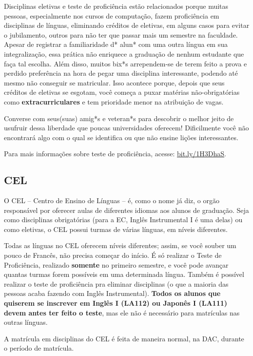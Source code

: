 Disciplinas eletivas e teste de proficiência estão relacionados porque muitas
pessoas, especialmente nos cursos de computação, fazem proficiência em
disciplinas de línguas, eliminando créditos de eletivas, em alguns casos para
evitar o jubilamento, outros para não ter que passar mais um semestre na
faculdade. Apesar de registrar a familiaridade d* alun* com uma outra língua em
sua integralização, essa prática não enriquece a graduação de nenhum estudante
que faça tal escolha. Além disso, muitos bix*s arrependem-se de terem feito a
prova e perdido preferência na hora de pegar uma disciplina interessante,
podendo até mesmo não conseguir se matricular. Isso acontece porque, depois que
seus créditos de eletivas se esgotam, você começa a puxar matérias
não-obrigatórias como \textbf{extracurriculares} e tem prioridade menor na
atribuição de vagas.

Converse com seus(suas) amig*s e veteran*s para descobrir o melhor jeito de
usufruir dessa liberdade que poucas universidades oferecem! Dificilmente você
não encontrará algo com o qual se identifica ou que não ensine lições
interessantes.

Para mais informações sobre teste de proficiência, acesse: \url{bit.ly/1H3DhaS}.

\subsection{CEL}

O CEL – Centro de Ensino de Línguas – é, como o nome já diz, o orgão responsável
por oferecer aulas de diferentes idiomas aos alunos de graduação. Seja como
disciplinas obrigatórias (para a EC, Inglês Instrumental I é uma delas) ou como
eletivas, o CEL possui turmas de várias línguas, em níveis diferentes.

Todas as línguas no CEL oferecem níveis diferentes; assim, se você souber um pouco
de Francês, não precisa começar do início. É só realizar o Teste de Proficiência,
realizado \textbf{somente} no primeiro semestre, e você pode avançar quantas turmas
forem possíveis em uma determinada língua. Também é possível realizar o teste de
proficiência pra eliminar disciplinas (o que a maioria das pessoas acaba fazendo
com Inglês Instrumental). \textbf{Todos os alunos que quiserem se inscrever em Inglês I
(LA112) ou Japonês I (LA111) devem antes ter feito o teste}, mas ele não é necessário
para matrículas nas outras línguas.

A matrícula em disciplinas do CEL é feita de maneira normal, na DAC, durante o
período de matrícula.

